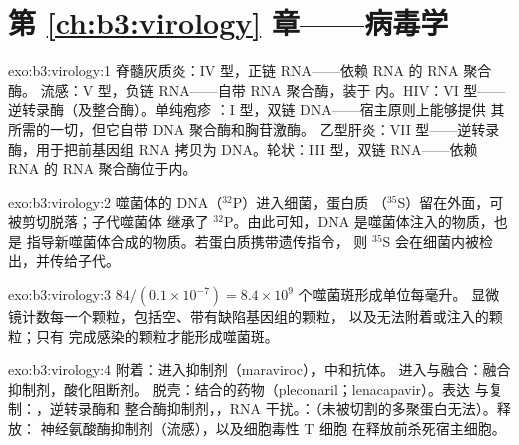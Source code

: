 \section*{第 \ref{ch:b3:virology} 章——病毒学}

\begin{solution}{exo:b3:virology:1}
脊髓灰质炎：IV 型，正链 RNA——依赖 RNA 的 RNA 聚合酶。
流感：V 型，负链 RNA——自带 RNA 聚合酶，装于
内。HIV：VI 型——逆转录酶（及整合酶）。单纯疱疹
：I 型，双链 DNA——宿主原则上能够提供
其所需的一切，但它自带 DNA 聚合酶和胸苷激酶。
乙型肝炎：VII 型——逆转录酶，用于把前基因组 RNA
拷贝为 DNA。轮状：III 型，双链 RNA——依赖 RNA 的 RNA
聚合酶位于内。
\end{solution}

\begin{solution}{exo:b3:virology:2}
噬菌体的 DNA（$^{32}$P）进入细菌，蛋白质
（$^{35}$S）留在外面，可被剪切脱落；子代噬菌体
继承了 $^{32}$P。由此可知，DNA 是噬菌体注入的物质，也是
指导新噬菌体合成的物质。若蛋白质携带遗传指令，
则 $^{35}$S 会在细菌内被检出，并传给子代。
\end{solution}

\begin{solution}{exo:b3:virology:3}
$84/(0.1\times 10^{-7}) = 8.4\times 10^{9}$ 个噬菌斑形成单位每毫升。
显微镜计数每一个颗粒，包括空、带有缺陷基因组的颗粒，
以及无法附着或注入的颗粒；只有
完成感染的颗粒才能形成噬菌斑。
\end{solution}

\begin{solution}{exo:b3:virology:4}
附着：进入抑制剂（maraviroc），中和抗体。
进入与融合：融合抑制剂，酸化阻断剂。
脱壳：结合的药物（pleconaril；lenacapavir）。表达
与复制：，逆转录酶和
整合酶抑制剂，，RNA 干扰。：（未被切割的多聚蛋白无法）。释放：
神经氨酸酶抑制剂（流感），以及细胞毒性 T 细胞
在释放前杀死宿主细胞。
\end{solution}

